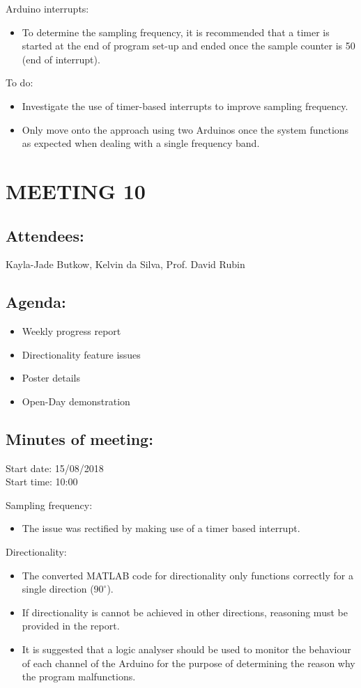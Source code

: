 \documentclass[10pt,onecolumn]{witseiepaper}
\begin{document}
Arduino interrupts:
\begin{itemize}
	\item To determine the sampling frequency, it is recommended that a timer is started at the end of program set-up and ended once the sample counter is 50 (end of interrupt).
\end{itemize}

To do:
\begin{itemize}
	\item Investigate the use of timer-based interrupts to improve sampling frequency.
	\item Only move onto the approach using two Arduinos once the system functions as expected when dealing with a single frequency band.
\end{itemize}

\section*{MEETING 10}
\subsection*{Attendees:}
Kayla-Jade Butkow, Kelvin da Silva, Prof. David Rubin
\subsection*{Agenda:} 
\begin{itemize}
	\item Weekly progress report
	\item Directionality feature issues
	\item Poster details
	\item Open-Day demonstration
\end{itemize}

\subsection*{Minutes of meeting:}
Start date: 15/08/2018 \\
Start time: 10:00

Sampling frequency:
\begin{itemize}
	\item The issue was rectified by making use of a timer based interrupt.
\end{itemize}

Directionality:
\begin{itemize}
	\item The converted MATLAB code for directionality only functions correctly for a single direction ($90^{\circ}$).
	\item If directionality is cannot be achieved in other directions, reasoning must be provided in the report.
	\item It is suggested that a logic analyser should be used to monitor the behaviour of each channel of the Arduino for the purpose of determining the reason why the program malfunctions.
\end{itemize}
\end{document}
